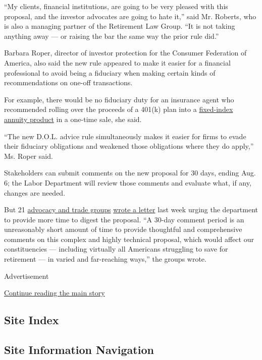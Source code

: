 ``My clients, financial institutions, are going to be very pleased with
this proposal, and the investor advocates are going to hate it,'' said
Mr. Roberts, who is also a managing partner of the Retirement Law Group.
``It is not taking anything away --- or raising the bar the same way the
prior rule did.''

Barbara Roper, director of investor protection for the Consumer
Federation of America, also said the new rule appeared to make it easier
for a financial professional to avoid being a fiduciary when making
certain kinds of recommendations on one-off transactions.

For example, there would be no fiduciary duty for an insurance agent who
recommended rolling over the proceeds of a 401(k) plan into a
\href{https://www.nytimes.com/2020/03/13/business/coronavirus-scams.html}{fixed-index
annuity product} in a one-time sale, she said.

``The new D.O.L. advice rule simultaneously makes it easier for firms to
evade their fiduciary obligations and weakened those obligations where
they do apply,'' Ms. Roper said.

Stakeholders can submit comments on the new proposal for 30 days, ending
Aug. 6; the Labor Department will review those comments and evaluate
what, if any, changes are needed.

But 21
\href{https://consumerfed.org/testimonial/dol-urged-to-provide-opportunity-for-comment-on-anti-investor-rule/}{advocacy
and trade groups}
\href{https://consumerfed.org/wp-content/uploads/2020/07/DOL-Advice-Rule-Extension-Request.pdf}{wrote
a letter} last week urging the department to provide more time to digest
the proposal. ``A 30-day comment period is an unreasonably short amount
of time to provide thoughtful and comprehensive comments on this complex
and highly technical proposal, which would affect our constituencies ---
including virtually all Americans struggling to save for retirement ---
in varied and far-reaching ways,'' the groups wrote.

Advertisement

\protect\hyperlink{after-bottom}{Continue reading the main story}

\hypertarget{site-index}{%
\subsection{Site Index}\label{site-index}}

\hypertarget{site-information-navigation}{%
\subsection{Site Information
Navigation}\label{site-information-navigation}}


